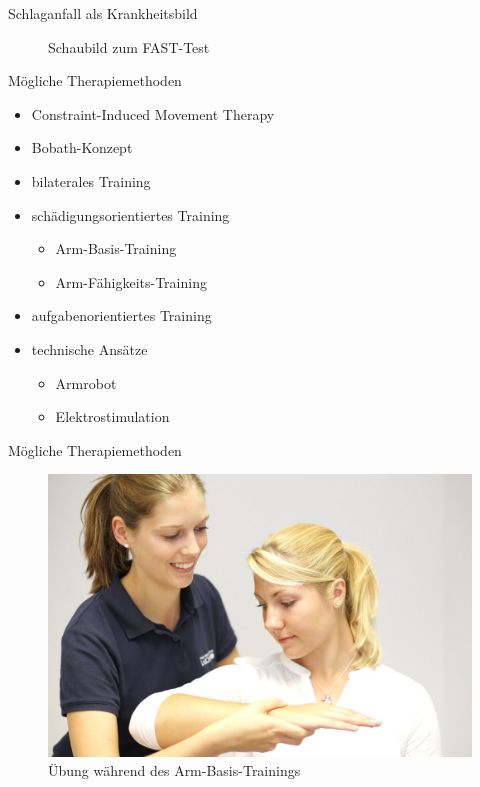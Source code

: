 \documentclass[hyphens]{beamer}
\begin{document}
\begin{frame}{Schlaganfall als Krankheitsbild}
\begin{figure}
	
	\caption{Schaubild zum FAST-Test}
\end{figure}
\end{frame}

\begin{frame}{Mögliche Therapiemethoden}
	\begin{itemize}
		\item Constraint-Induced Movement Therapy
		\item Bobath-Konzept
		\item bilaterales Training
		\item schädigungsorientiertes Training
		\begin{itemize}
			\item Arm-Basis-Training
			\item Arm-Fähigkeits-Training
		\end{itemize}
		\item aufgabenorientiertes Training
		\item technische Ansätze
		\begin{itemize}
			\item Armrobot
			\item Elektrostimulation
		\end{itemize}
	\end{itemize}
\end{frame}

\begin{frame}{Mögliche Therapiemethoden}
\begin{figure}
	\includegraphics[scale=0.2]{pics/armbasis}
	\caption{Übung während des Arm-Basis-Trainings}
\end{figure}
\end{frame}
\end{document}
